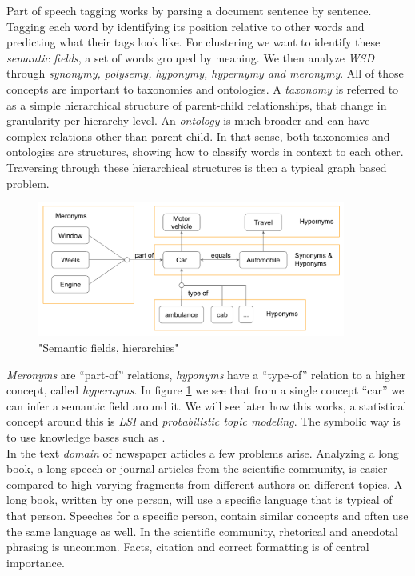   Part of speech tagging works by parsing a document sentence by sentence. Tagging each word by identifying its position relative to other words and predicting what their tags look like. \cite[chp. 5]{NLPBookJurafsky2000}
  For clustering we want to identify these \emph{semantic fields}, a set of words grouped by meaning. We then analyze \emph{WSD} through \emph{synonymy, polysemy, hyponymy, hypernymy and meronymy}. All of those concepts are important to taxonomies and ontologies. A \emph{taxonomy} is referred to as a simple hierarchical structure of parent-child relationships, that change in granularity per hierarchy level. An \emph{ontology} is much broader and can have complex relations other than parent-child. In that sense, both taxonomies and ontologies are structures, showing how to classify words in context to each other. Traversing through these hierarchical structures is then a typical graph based problem.

    \begin{figure}[h!]
      \centering
        \includegraphics[width=0.9\textwidth]{wsd_analysis.png}
        \caption{"Semantic fields, hierarchies"}
        \label{wsd_analysis}
    \end{figure} 

  \emph{Meronyms} are ``part-of'' relations, \emph{hyponyms} have a ``type-of'' relation to a higher concept, called \emph{hypernyms}. In figure \ref{wsd_analysis} we see that from a single concept ``car'' we can infer a semantic field around it. We will see later how this works, a statistical concept around this is \emph{LSI} and \emph{probabilistic topic modeling}. The symbolic way is to use knowledge bases such as \wordwiki{}.\\

  In the text \emph{domain} of newspaper articles a few problems arise. Analyzing a long book, a long speech or journal articles from the scientific community, is easier compared to high varying fragments from different authors on different topics. A long book, written by one person, will use a specific language that is typical of that person. Speeches for a specific person, contain similar concepts and often use the same language as well. In the scientific community, rhetorical and anecdotal phrasing is uncommon. Facts, citation and correct formatting is of central importance.\\

